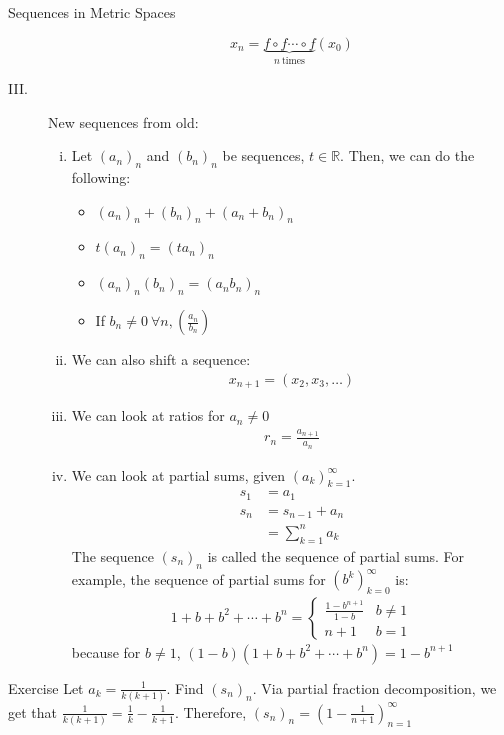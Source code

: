 \documentclass[8pt]{extarticle}
\newcommand{\R}{\mathbb{R}}
\begin{document}
\begin{problem}{Sequences in Metric Spaces}
\begin{description}
\begin{enumerate}[(i)]
            \[x_n = \underbrace{f\circ f\cdots \circ f}_{n~\text{times}}(x_0)\]
        \end{enumerate}
      \item[III.] New sequences from old: 
        \begin{enumerate}[(i)]
          \item Let $(a_n)_n$ and $(b_n)_n$ be sequences, $t\in\R$. Then, we can do the following:
            \begin{itemize}
              \item $(a_n)_n + (b_n)_n + (a_n + b_n)_n$
              \item $t(a_n)_n = (ta_n)_n$
              \item $(a_n)_n(b_n)_n = (a_nb_n)_n$
              \item If $b_n \neq 0~\forall n, \left(\frac{a_n}{b_n}\right)$
            \end{itemize}
          \item We can also shift a sequence:
            \begin{align*}
              x_{n+1} = (x_2,x_3,\dots)
            \end{align*}
          \item We can look at ratios for $a_n\neq 0$
            \begin{align*}
              r_n = \frac{a_{n+1}}{a_n}
            \end{align*}
          \item We can look at partial sums, given $(a_k)_{k=1}^{\infty}$.
            \begin{align*}
              s_1 &= a_1\\
              s_n &= s_{n-1} + a_n\\
                  &= \sum_{k=1}^{n}a_k
            \end{align*}
            The sequence $(s_n)_n$ is called the sequence of partial sums. For example, the sequence of partial sums for $(b^k)_{k=0}^{\infty}$ is:
            \begin{align*}
              1 + b + b^2 + \cdots + b^n = \begin{cases}
                \frac{1-b^{n+1}}{1-b}&b\neq 1\\
                n+1&b=1
              \end{cases}
            \end{align*}
            because for $b \neq 1$, $(1-b)(1+b+b^2+\cdots+b^n) = 1-b^{n+1}$
        \end{enumerate}
    \end{description}
    \begin{problem}{Exercise}
      Let $a_k = \frac{1}{k(k+1)}$. Find $(s_n)_n$.
      \tcblower
      Via partial fraction decomposition, we get that $\frac{1}{k(k+1)} = \frac{1}{k}-\frac{1}{k+1}$. Therefore, $(s_n)_n = \left(1-\frac{1}{n+1}\right)_{n=1}^{\infty}$
    \end{problem}
  \end{problem}
\end{document}
